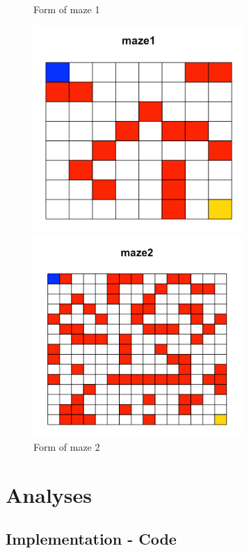 \documentclass[final,12pt,3p]{elsarticle}
\begin{document}
\begin{figure}[H]
    \centering
    \begin{minipage}{.5\textwidth}
      \centering
      \caption{Form of maze 1}
      \includegraphics[width=8cm]{figures/EmptyMaze1Map.png}
    \end{minipage}%
    \begin{minipage}{.5\textwidth}
      \centering
      \caption{Form of maze 2}
      \includegraphics[width=8cm]{figures/EmptyMaze2Map.png}
    \end{minipage}
\end{figure}

\section{Analyses}

\subsection{Implementation - Code}
\vspace{12pt}
\end{document}
